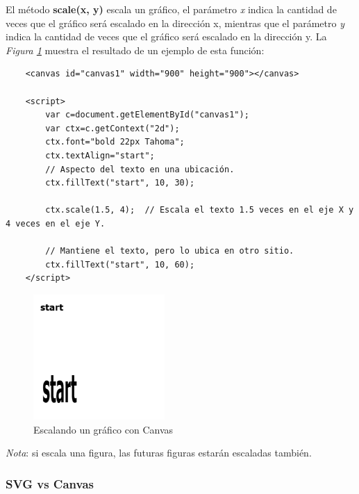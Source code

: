 El método \textbf{scale(x, y)} escala un gráfico, el parámetro \textit{x} indica la cantidad de veces que el gráfico será escalado en la dirección x, mientras que el parámetro \textit{y} indica la cantidad de veces que el gráfico será escalado en la dirección y. La \textit{Figura \ref{fig: 30}} muestra el resultado de un ejemplo de esta función:
\begin{lstlisting}
    <canvas id="canvas1" width="900" height="900"></canvas> 
            
    <script>
        var c=document.getElementById("canvas1");
        var ctx=c.getContext("2d");
        ctx.font="bold 22px Tahoma";
        ctx.textAlign="start";
        // Aspecto del texto en una ubicación.
        ctx.fillText("start", 10, 30);
        
        ctx.scale(1.5, 4);  // Escala el texto 1.5 veces en el eje X y 4 veces en el eje Y.

        // Mantiene el texto, pero lo ubica en otro sitio.
        ctx.fillText("start", 10, 60);
    </script>
\end{lstlisting}
\begin{figure}[H]
    \centering
    \caption{Escalando un gráfico con Canvas}
    \label{fig: 30}
    \includegraphics[width=5cm]{ss_html/canvas_scale.png}
\end{figure}

\textit{Nota}: si escala una figura, las futuras figuras estarán escaladas también.


\subsubsection{SVG vs Canvas}

